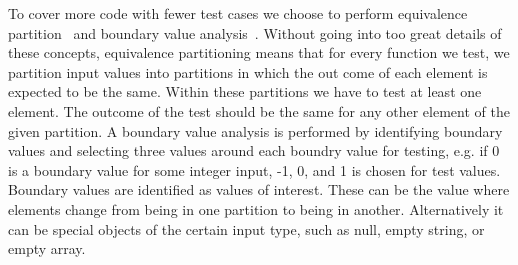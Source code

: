 To cover more code with fewer test cases we choose to perform equivalence partition~\cite{testbogen_or_slidesfromsecondlecture} and boundary value analysis~\cite{testbogen_or_slidesfromsecondlecture}.
Without going into too great details of these concepts, equivalence partitioning means that for every function we test, we partition input values into partitions in which the out come of each element is expected to be the same.
Within these partitions we have to test at least one element.
The outcome of the test should be the same for any other element of the given partition.
A boundary value analysis is performed by identifying boundary values and selecting three values around each boundry value for testing, e.g. if 0 is a boundary value for some integer input, -1, 0, and 1 is chosen for test values.
Boundary values are identified as values of interest.
These can be the value where elements change from being in one partition to being in another.
Alternatively it can be special objects of the certain input type, such as null, empty string, or empty array.